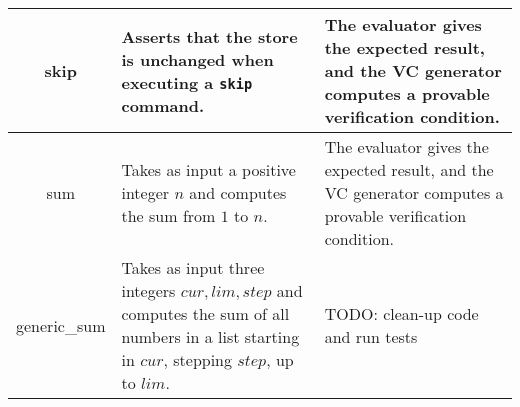 \begin{tabular}{|c|p{4.4cm}|p{4.4cm}|}
 	\hline
 	skip &
   Asserts that the store is unchanged when executing a \texttt{skip} command. & 
   The evaluator gives the expected result, and the VC generator computes a provable verification condition. \\
 	\hline
 	sum & 
   Takes as input a positive integer $n$ and computes the sum from $1$ to $n$. & 
   The evaluator gives the expected result, and the VC generator computes a provable verification condition. \\
 	\hline
 	generic_sum & 
   Takes as input three integers $cur, lim, step$ and computes the sum of all numbers in a list starting in $cur$, stepping $step$, up to $lim$. &
   TODO: clean-up code and run tests \\
 	\hline
\end{tabular}

